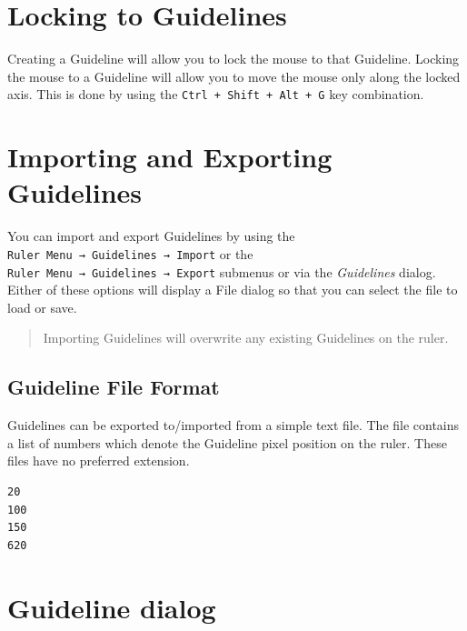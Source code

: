\documentclass[
]{book}
\begin{document}
\section{Locking to Guidelines}\label{locking-to-guidelines}

Creating a Guideline will allow you to lock the mouse to that Guideline.
Locking the mouse to a Guideline will allow you to move the mouse only along the locked axis.
This is done by using the \texttt{Ctrl\ +\ Shift\ +\ Alt\ +\ G} key combination.

\section{Importing and Exporting Guidelines}\label{importing-and-exporting-guidelines}

You can import and export Guidelines by using the \texttt{Ruler\ Menu\ →\ Guidelines\ →\ Import} or the \texttt{Ruler\ Menu\ →\ Guidelines\ →\ Export} submenus or via the \emph{Guidelines} dialog.
Either of these options will display a File dialog so that you can select the file to load or save.

\begin{quote}
Importing Guidelines will overwrite any existing Guidelines on the ruler.
\end{quote}

\subsection{Guideline File Format}\label{guideline-file-format}

Guidelines can be exported to/imported from a simple text file.
The file contains a list of numbers which denote the Guideline pixel position on the ruler.
These files have no preferred extension.

\begin{verbatim}
20
100
150
620
\end{verbatim}

\section{Guideline dialog}\label{guideline-dialog}
\end{document}
